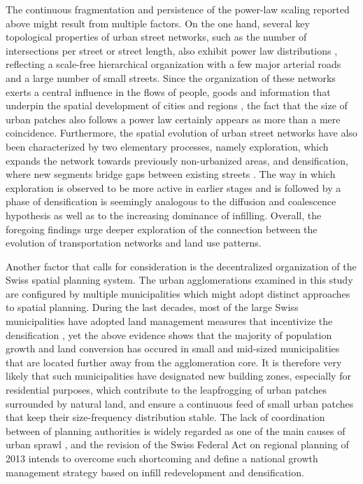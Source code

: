 The continuous fragmentation and persistence of the power-law scaling reported above might result from multiple factors.
On the one hand, several key topological properties of urban street networks, such as the number of intersections per street or street length, also exhibit power law distributions \citep{jiang2007topological}, reflecting a scale-free hierarchical organization with a few major arterial roads and a large number of small streets.
Since the organization of these networks exerts a central influence in the flows of people, goods and information that underpin the spatial development of cities and regions \citep{bettencourt2007growth, batty2008size}, the fact that the size of urban patches also follows a power law certainly appears as more than a mere coincidence. %
Furthermore, the spatial evolution of urban street networks have also been characterized by two elementary processes, namely exploration, which expands the network towards previously non-urbanized areas, and densification, where new segments bridge gaps between existing streets \citep{strano2012elementary}.
The way in which exploration is observed to be more active in earlier stages and is followed by a phase of densification is seemingly analogous to the diffusion and coalescence hypothesis as well as to the increasing dominance of infilling.
Overall, the foregoing findings urge deeper exploration of the connection between the evolution of transportation networks and land use patterns.

Another factor that calls for consideration is the decentralized organization of the Swiss spatial planning system.
The urban agglomerations examined in this study are configured by multiple municipalities which might adopt distinct approaches to spatial planning.
During the last decades, most of the large Swiss municipalities have adopted land management measures that incentivize the densification \citep{rudolf2018planning}, yet the above evidence shows that the majority of population growth and land conversion has occured in small and mid-sized municipalities that are located further away from the agglomeration core.
It is therefore very likely that such municipalities have designated new building zones, especially for residential purposes, which contribute to the leapfrogging of urban patches surrounded by natural land, and ensure a continuous feed of small urban patches that keep their size-frequency distribution stable.
The lack of coordination between of planning authorities is widely regarded as one of the main causes of urban sprawl \citep{carruthers2002fragmentation, mann2009institutional}, and the revision of the Swiss Federal Act on regional planning of 2013 intends to overcome such shortcoming and define a national growth management strategy based on infill redevelopment and densification.



